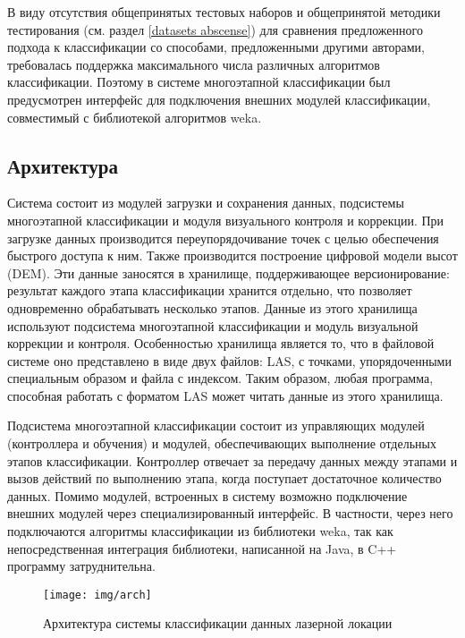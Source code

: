 В виду отсутствия общепринятых тестовых наборов и общепринятой методики тестирования (см. раздел \ref{datasets abscense}) для сравнения предложенного подхода к классификации со способами, предложенными другими авторами, требовалась поддержка максимального числа различных алгоритмов классификации. Поэтому в системе многоэтапной классификации был предусмотрен интерфейс для подключения внешних модулей классификации, совместимый с библиотекой алгоритмов weka.

\subsection{Архитектура}
Система состоит из модулей загрузки и сохранения данных, подсистемы многоэтапной классификации и модуля визуального контроля и коррекции. При загрузке данных производится переупорядочивание точек с целью обеспечения быстрого доступа к ним. Также производится построение цифровой модели высот (DEM). Эти данные заносятся в хранилище, поддерживающее версионирование: результат каждого этапа классификации хранится отдельно, что позволяет одновременно обрабатывать несколько этапов. Данные из этого хранилища используют подсистема многоэтапной классификации и модуль визуальной коррекции и контроля. Особенностью хранилища является то, что в файловой системе оно представлено в виде двух файлов: LAS, с точками, упорядоченными специальным образом и файла с индексом. Таким образом, любая программа, способная работать с форматом LAS может читать данные из этого хранилища.

Подсистема многоэтапной классификации состоит из управляющих модулей (контроллера и обучения) и модулей, обеспечивающих выполнение отдельных этапов классификации. Контроллер отвечает за передачу данных между этапами и вызов действий по выполнению этапа, когда поступает достаточное количество данных. Помимо модулей, встроенных в систему возможно подключение внешних модулей через специализированный интерфейс. В частности, через него подключаются алгоритмы классификации из библиотеки weka, так как непосредственная интеграция библиотеки, написанной на Java, в C++ программу затруднительна. 

\begin{figure}[h]
\begin{center}
\texttt{[image: img/arch]}
\end{center}
\caption{Архитектура системы классификации данных лазерной локации}
\label{arch}
\end{figure}

